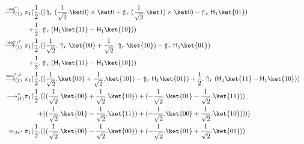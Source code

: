 \documentclass[preprint]{elsarticle}
\newcommand\lra[1][1]{\longrightarrow_{\left(#1\right)}}
\newcommand\pair[2]{({#1}+{#2})}
\newcommand\npair[2]{({#1}-{#2})}
\newcommand\s[1]{\ensuremath{\mathsf{#1}}}
\newcommand\red[2][1]{\overset{\scriptscriptstyle\smash{#2}\vphantom{x}}{\lra[#1]}\ }
\newcommand\rcaneutr{(\s{neut^\Uparrow_r})}
\newcommand\rdistscalr{(\s{dist^\alpha_r})}
\newcommand\rdistsumr{(\s{dist^+_r})}
\begin{document}
\begin{align*}
  \\
  \red\rdistsumr&
                  \begin{aligned}[t]
                    \pi_1 ( & { \frac 12.  \npair{ \pair { \Uparrow_r (\frac 1{\sqrt 2}.\ket 0)\times\ket 0 }{ \Uparrow_r (\frac 1{\sqrt 2}.\ket 1)\times\ket 0 } }{ \Uparrow_r \s H_1\ket{01} } }\\
                    +& { \frac 12. \Uparrow_r \npair{\s
                        H_1\ket{11}}{\s H_1\ket{10}} })
                  \end{aligned}
  \\
  \red{\rdistscalr^2}&
                       \begin{aligned}[t]
                         \pi_1 ( & { \frac 12. \npair{ \pair { \frac 1{\sqrt
                                 2}.\Uparrow_r\ket{00} }{
                               \frac 1{\sqrt
                                 2}.\Uparrow_r\ket{10} }
                           }{ \Uparrow_r \s H_1\ket{01} }
                         }\\
                         +& { \frac 12. \Uparrow_r
                           \npair{\s H_1\ket{11}}{\s H_1\ket{10}} } )
                       \end{aligned}
  \\
  \red{\rcaneutr^2}&
                     \pi_1 ( { \frac 12.  \npair{ \pair { \frac 1{\sqrt 2}.\ket{00} }{ \frac 1{\sqrt 2}.\ket{10} } }{ \Uparrow_r \s H_1\ket{01} } }
                     +
                     { \frac 12.  \Uparrow_r \npair{\s H_1\ket{11}}{\s H_1\ket{10}} }) \\
  \lra^*&
          \begin{aligned}[t]
            \pi_1 (\frac 12. ( &{ \pair { \pair{\frac 1{\sqrt 2}.\ket{00}}{\frac
                  1{\sqrt 2}.\ket{10}} }{ \npair{-\frac 1{\sqrt
                    2}.\ket{01}}{\frac 1{\sqrt 2}.\ket{11}} }
            }\\
            +& { \pair{ \npair{\frac 1{\sqrt 2}.\ket{01}}{\frac 1{\sqrt
                    2}.\ket{11}} }{ \pair{-\frac 1{\sqrt 2}.\ket{00}}{\frac
                  1{\sqrt 2}.\ket{10}} } } ) )
          \end{aligned}
  \\
  =_{AC}\ &
            \begin{aligned}[t]
              \pi_1 (\frac 12. ( &{ \pair { \npair {\frac 1{\sqrt 2}.\ket{00}}
                  {\frac 1{\sqrt 2}.\ket{00}} }{ \pair {-\frac 1{\sqrt
                      2}.\ket{01}} {\frac 1{\sqrt 2}.\ket{01}} }
              }\\

\end{aligned}
\end{align*}
\end{document}
